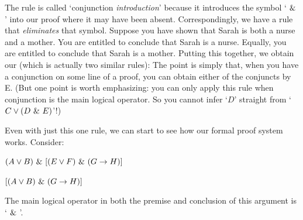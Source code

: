 The rule is called `conjunction \emph{introduction}' because it introduces the symbol `$~\&~$' into our proof where it may have been absent. Correspondingly, we have a rule that \emph{eliminates} that symbol.  Suppose you have shown that Sarah is both a nurse and a mother. You are entitled to conclude that Sarah is a nurse. Equally, you are entitled to conclude that Sarah is a mother. Putting this together, we obtain our  (which is actually two similar rules):
\factoidbox{
\begin{proof}
	\have[m]{ab}{\meta{A}\eand\meta{B}}
	\have[\ ]{a}{\meta{A}} \ae{ab}
\end{proof}
\textit{and equally:}
\begin{proof}
	\have[m]{ab}{\meta{A}\eand\meta{B}}
	\have[\ ]{b}{\meta{B}} \ae{ab}
\end{proof}}
The point is simply that, when you have a conjunction on some line of a proof, you can obtain either of the conjuncts by {\eand}E. (But one point is worth emphasizing: you can only apply this rule when conjunction is the main logical operator. So you cannot infer `$D$' straight from `$C \vee (D ~\&~ E)$'!)

Even with just this one rule, we can start to see how our formal proof system works. Consider:
\begin{earg}
\item[] $(A\vee B) ~\&~ [(E \vee F) ~\&~ (G\rightarrow H)]$
\item[\therefore] $[(A\vee B)~\&~(G\rightarrow H)]$
\end{earg}

The main logical operator in both the premise and conclusion of this argument is `$~\&~$'. 

